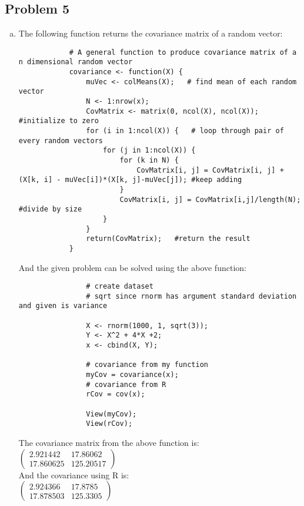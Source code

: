 \documentclass{article}
\begin{document}
\begin{enumerate}[(i)]
\begin{enumerate}[(a)]
        \subsection{Problem 5} %
        \label{sub:proble_5}
        \begin{enumerate}[(a)]
            \item The following function returns the covariance matrix of a random vector:\\
            \begin{lstlisting}
            # A general function to produce covariance matrix of a n dimensional random vector 
            covariance <- function(X) {
                muVec <- colMeans(X);   # find mean of each random vector
                N <- 1:nrow(x);
                CovMatrix <- matrix(0, ncol(X), ncol(X));  #initialize to zero
                for (i in 1:ncol(X)) {   # loop through pair of every random vectors
                    for (j in 1:ncol(X)) {
                        for (k in N) {
                            CovMatrix[i, j] = CovMatrix[i, j] + (X[k, i] - muVec[i])*(X[k, j]-muVec[j]); #keep adding
                        }
                        CovMatrix[i, j] = CovMatrix[i,j]/length(N); #divide by size
                    }
                }
                return(CovMatrix);   #return the result
            }
            \end{lstlisting}
            And the given problem can be solved using the above function:\\
            \begin{lstlisting}
                # create dataset
                # sqrt since rnorm has argument standard deviation and given is variance

                X <- rnorm(1000, 1, sqrt(3));
                Y <- X^2 + 4*X +2;
                x <- cbind(X, Y);

                # covariance from my function
                myCov = covariance(x);
                # covariance from R
                rCov = cov(x);

                View(myCov);
                View(rCov);
            \end{lstlisting}
            The covariance matrix from the above function is:\\
            $\begin{pmatrix}
                2.921442 & 17.86062 \\
                17.860625 & 125.20517
            \end{pmatrix}$\\
            And the covariance using R is:\\
            $\begin{pmatrix}
                2.924366 & 17.8785 \\
                17.878503 & 125.3305
            \end{pmatrix}$\\


\end{enumerate}
\end{enumerate}
\end{enumerate}
\end{document}
